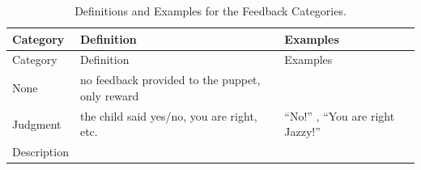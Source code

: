 \documentclass[man]{apa6}
\theoremstyle{definition}
\theoremstyle{definition}
\theoremstyle{definition}
\theoremstyle{remark}
\begin{document}
\begin{longtable}[]{@{}lll@{}}
\caption{\label{tab:feedbackCat} Definitions and Examples for the Feedback
Categories.}\tabularnewline
\toprule
\begin{minipage}[b]{0.11\columnwidth}\raggedright\strut
Category\strut
\end{minipage} & \begin{minipage}[b]{0.46\columnwidth}\raggedright\strut
Definition\strut
\end{minipage} & \begin{minipage}[b]{0.32\columnwidth}\raggedright\strut
Examples\strut
\end{minipage}\tabularnewline
\midrule
\endfirsthead
\toprule
\begin{minipage}[b]{0.11\columnwidth}\raggedright\strut
Category\strut
\end{minipage} & \begin{minipage}[b]{0.46\columnwidth}\raggedright\strut
Definition\strut
\end{minipage} & \begin{minipage}[b]{0.32\columnwidth}\raggedright\strut
Examples\strut
\end{minipage}\tabularnewline
\midrule
\endhead
\begin{minipage}[t]{0.11\columnwidth}\raggedright\strut
None\strut
\end{minipage} & \begin{minipage}[t]{0.46\columnwidth}\raggedright\strut
no feedback provided to the puppet, only reward\strut
\end{minipage} & \begin{minipage}[t]{0.32\columnwidth}\raggedright\strut
\strut
\end{minipage}\tabularnewline
\begin{minipage}[t]{0.11\columnwidth}\raggedright\strut
Judgment\strut
\end{minipage} & \begin{minipage}[t]{0.46\columnwidth}\raggedright\strut
the child said yes/no, you are right, etc.\strut
\end{minipage} & \begin{minipage}[t]{0.32\columnwidth}\raggedright\strut
\enquote{No!} , \enquote{You are right Jazzy!}\strut
\end{minipage}\tabularnewline
\begin{minipage}[t]{0.11\columnwidth}\raggedright\strut
Description\strut
\end{minipage} & \begin{minipage}[t]{0.46\columnwidth}\raggedright\strut

\end{minipage}
\end{longtable}
\end{document}
